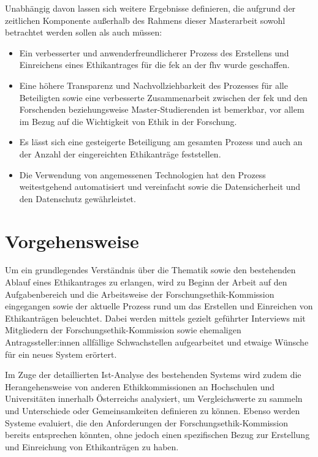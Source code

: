 \documentclass[a4paper,12pt,twoside]{scrreprt}
\begin{document}
\medskip

Unabhängig davon lassen sich weitere Ergebnisse definieren, die aufgrund der zeitlichen Komponente außerhalb des Rahmens dieser Masterarbeit sowohl betrachtet werden sollen als auch müssen:
\begin{itemize}
    \item Ein verbesserter und anwenderfreundlicherer Prozess des Erstellens und Einreichens eines Ethikantrages für die \acl{fek} an der \acl{fhv} wurde geschaffen.
    \item Eine höhere Transparenz und Nachvollziehbarkeit des Prozesses für alle Beteiligten sowie eine verbesserte Zusammenarbeit zwischen der \acl{fek} und den Forschenden beziehungsweise Master-Studierenden ist bemerkbar, vor allem im Bezug auf die Wichtigkeit von Ethik in der Forschung.
    \item Es lässt sich eine gesteigerte Beteiligung am gesamten Prozess und auch an der Anzahl der eingereichten Ethikanträge feststellen.
    \item Die Verwendung von angemessenen Technologien hat den Prozess weitestgehend automatisiert und vereinfacht sowie die Datensicherheit und den Datenschutz gewährleistet.
\end{itemize}

\section{Vorgehensweise}
\label{sec:vorgehensweise}

Um ein grundlegendes Verständnis über die Thematik sowie den bestehenden Ablauf eines Ethikantrages zu erlangen, wird zu Beginn der Arbeit auf den Aufgabenbereich und die Arbeitsweise der Forschungsethik-Kommission eingegangen sowie der aktuelle Prozess rund um das Erstellen und Einreichen von Ethikanträgen beleuchtet. Dabei werden mittels gezielt geführter Interviews mit Mitgliedern der Forschungsethik-Kommission sowie ehemaligen Antragssteller:innen allfällige Schwachstellen aufgearbeitet und etwaige Wünsche für ein neues System erörtert.

Im Zuge der detaillierten Ist-Analyse des bestehenden Systems wird zudem die Herangehensweise von anderen Ethikkommissionen an Hochschulen und Universitäten innerhalb Österreichs analysiert, um Vergleichswerte zu sammeln und Unterschiede oder Gemeinsamkeiten definieren zu können. Ebenso werden Systeme evaluiert, die den Anforderungen der Forschungsethik-Kommission bereits entsprechen könnten, ohne jedoch einen spezifischen Bezug zur Erstellung und Einreichung von Ethikanträgen zu haben.
\end{document}
